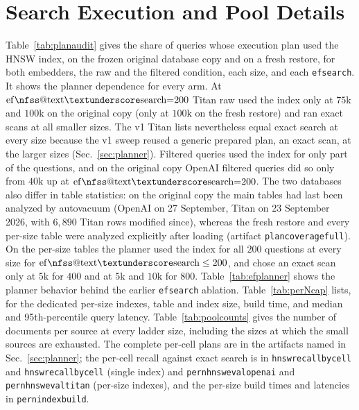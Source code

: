 \documentclass{ieeeaccess}
\makeatletter
\DeclareRobustCommand{\_}{\ifmmode\nfss@text{\textunderscore}\else\textunderscore\allowbreak\fi}
\makeatother
\begin{document}
\section{Search Execution and Pool Details}
\label{app:exec}
Table~\ref{tab:planaudit} gives the share of queries whose execution plan used the HNSW index, on the frozen original database copy and on a fresh restore, for both embedders, the raw and the filtered condition, each size, and each \texttt{ef\_search}. It shows the planner dependence for every arm. At $\mathrm{ef\_search}{=}200$ Titan raw used the index only at $75\text{k}$ and $100\text{k}$ on the original copy (only at $100\text{k}$ on the fresh restore) and ran exact scans at all smaller sizes. The v1 Titan lists nevertheless equal exact search at every size because the v1 sweep reused a generic prepared plan, an exact scan, at the larger sizes (Sec.~\ref{sec:planner}). Filtered queries used the index for only part of the questions, and on the original copy OpenAI filtered queries did so only from $40\text{k}$ up at $\mathrm{ef\_search}{=}200$. The two databases also differ in table statistics: on the original copy the main tables had last been analyzed by autovacuum (OpenAI on 27 September, Titan on 23 September 2026, with $6{,}890$ Titan rows modified since), whereas the fresh restore and every per-size table were analyzed explicitly after loading (artifact \texttt{plan\_coverage\_full}). On the per-size tables the planner used the index for all $200$ questions at every size for $\mathrm{ef\_search}\le200$, and chose an exact scan only at $5\text{k}$ for $400$ and at $5\text{k}$ and $10\text{k}$ for $800$. Table~\ref{tab:efplanner} shows the planner behavior behind the earlier \texttt{ef\_search} ablation. Table~\ref{tab:perNcap} lists, for the dedicated per-size indexes, table and index size, build time, and median and 95th-percentile query latency. Table~\ref{tab:poolcounts} gives the number of documents per source at every ladder size, including the sizes at which the small sources are exhausted. The complete per-cell plans are in the artifacts named in Sec.~\ref{sec:planner}; the per-cell recall against exact search is in \texttt{hnsw\_recall\_by\_cell\_5433} and \texttt{hnsw\_recall\_by\_cell\_5434} (single index) and \texttt{per\_n\_hnsw\_eval\_openai} and \texttt{per\_n\_hnsw\_eval\_titan} (per-size indexes), and the per-size build times and latencies in \texttt{per\_n\_index\_build\_*}.




\end{document}
